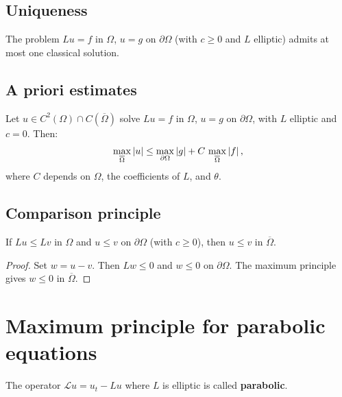 \subsection{Uniqueness}

\begin{corollary}
The problem $Lu = f$ in $\Omega$, $u = g$ on $\partial\Omega$
(with $c \geq 0$ and $L$ elliptic) admits at most one classical solution.
\end{corollary}

\subsection{A priori estimates}

\begin{theorem}
Let $u \in C^2(\Omega) \cap C(\overline{\Omega})$ solve $Lu = f$ in
$\Omega$, $u = g$ on $\partial\Omega$, with $L$ elliptic and $c = 0$.
Then:
\begin{equation}\label{eq:a_priori_estimate}
    \max_{\overline{\Omega}} \left| u \right| \leq \max_{\partial\Omega} \left| g \right|
    + C\, \max_{\overline{\Omega}} \left| f \right|,
\end{equation}
where $C$ depends on $\Omega$, the coefficients of $L$, and $\theta$.
\end{theorem}

\subsection{Comparison principle}

\begin{theorem}
If $Lu \leq Lv$ in $\Omega$ and $u \leq v$ on $\partial\Omega$
(with $c \geq 0$), then $u \leq v$ in $\overline{\Omega}$.
\end{theorem}

\begin{proof}
Set $w = u - v$. Then $Lw \leq 0$ and $w \leq 0$ on $\partial\Omega$.
The maximum principle gives $w \leq 0$ in $\overline{\Omega}$.
\end{proof}

\section{Maximum principle for parabolic equations}

\begin{definition}
The operator $\mathcal{L}u = u_t - Lu$ where $L$ is elliptic is called
\textbf{parabolic}.
\end{definition}

